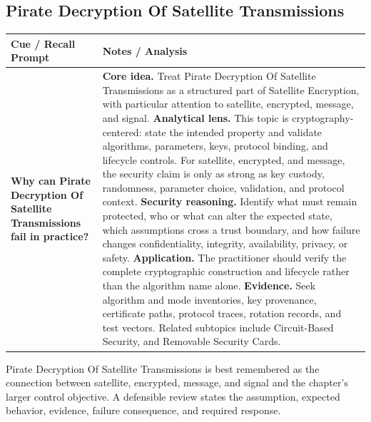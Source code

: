 \documentclass[11pt]{article}
\newcommand{\CornellHeader}{%
\rowcolor{Navy}\color{white}\bfseries Cue / Recall Prompt & \color{white}\bfseries Notes / Analysis\\\hline}
\newcommand{\CornellRow}[2]{%
\cellcolor{CueGray}\RaggedRight\textbf{#1} & \RaggedRight #2\\\hline}
\begin{document}
\subsection*{Pirate Decryption Of Satellite Transmissions}
\begin{longtable}{>{\RaggedRight\arraybackslash}p{}|>{\RaggedRight\arraybackslash}p{}}
\CornellHeader
\CornellRow{Why can Pirate Decryption Of Satellite Transmissions fail in practice?}{\textbf{Core idea.} Treat Pirate Decryption Of Satellite Transmissions as a structured part of Satellite Encryption, with particular attention to satellite, encrypted, message, and signal. \textbf{Analytical lens.} This topic is cryptography-centered: state the intended property and validate algorithms, parameters, keys, protocol binding, and lifecycle controls. For satellite, encrypted, and message, the security claim is only as strong as key custody, randomness, parameter choice, validation, and protocol context. \textbf{Security reasoning.} Identify what must remain protected, who or what can alter the expected state, which assumptions cross a trust boundary, and how failure changes confidentiality, integrity, availability, privacy, or safety. \textbf{Application.} The practitioner should verify the complete cryptographic construction and lifecycle rather than the algorithm name alone. \textbf{Evidence.} Seek algorithm and mode inventories, key provenance, certificate paths, protocol traces, rotation records, and test vectors. Related subtopics include Circuit-Based Security, and Removable Security Cards.}
\end{longtable}
\begin{topicsummary}
Pirate Decryption Of Satellite Transmissions is best remembered as the connection between satellite, encrypted, message, and signal and the chapter's larger control objective. A defensible review states the assumption, expected behavior, evidence, failure consequence, and required response.
\end{topicsummary}
\end{document}
